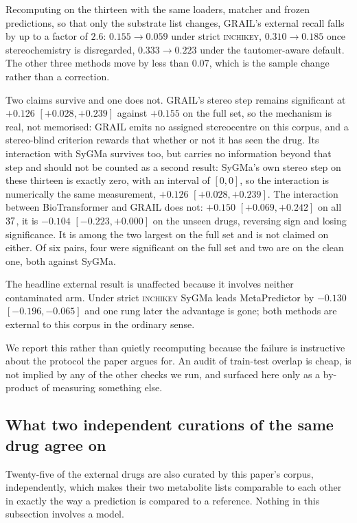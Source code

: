 Recomputing on the thirteen with the same loaders, matcher and frozen predictions, so that only the
substrate list changes, GRAIL's external recall falls by up to a factor of $2.6$: $0.155 \to 0.059$
under strict \textsc{inchikey}, $0.310 \to 0.185$ once stereochemistry is disregarded, $0.333 \to
0.223$ under the tautomer-aware default. The other three methods move by less than $0.07$, which is
the sample change rather than a correction.

Two claims survive and one does not. GRAIL's stereo step remains significant at $+0.126$
$[+0.028,+0.239]$ against $+0.155$ on the full set, so the mechanism is real, not memorised:
GRAIL emits no assigned stereocentre on this corpus, and a stereo-blind criterion rewards that
whether or not it has seen the drug. Its interaction with SyGMa survives too, but carries no information beyond that step
and should not be counted as a second result: SyGMa's own stereo step on these thirteen is exactly
zero, with an interval of $[0,0]$, so the interaction is numerically the same measurement,
$+0.126$ $[+0.028,+0.239]$. The
interaction between BioTransformer and GRAIL does not: $+0.150$ $[+0.069,+0.242]$ on all $37$,
it is $-0.104$ $[-0.223,+0.000]$ on the unseen drugs, reversing sign and losing significance. It is
among the two largest on the full set and is not claimed on either. Of six pairs, four were significant on the full set
and two are on the clean one, both against SyGMa.

The headline external result is unaffected because it involves neither contaminated arm. Under
strict \textsc{inchikey} SyGMa leads MetaPredictor by $-0.130$ $[-0.196,-0.065]$ and one rung later
the advantage is gone; both methods are external to this corpus in the ordinary sense.

We report this rather than quietly recomputing because the failure is instructive about the protocol
the paper argues for. An audit of train-test overlap is cheap, is not implied by any of the other
checks we run, and surfaced here only as a by-product of measuring something else.

\subsection{What two independent curations of the same drug agree on}

Twenty-five of the external drugs are also curated by this paper's corpus, independently, which
makes their two metabolite lists comparable to each other in exactly the way a prediction is
compared to a reference. Nothing in this subsection involves a model.

